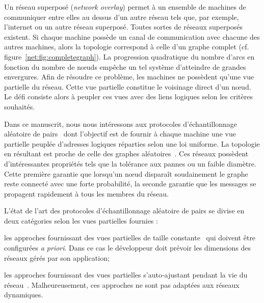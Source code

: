 Un réseau superposé (\emph{network overlay}) permet à un ensemble de machines de
communiquer entre elles au dessus d'un autre réseau tels que, par exemple,
l'internet ou un autre réseau superposé.  Toutes sortes de réseaux superposés
existent. Si chaque machine possède un canal de communication avec chacune des
autres machines, alors la topologie correspond à celle d'un graphe complet
(cf. figure~\ref{net:fig:completegraph}). La progression quadratique du nombre
d'arcs en fonction du nombre de nœuds empêche un tel système d'atteindre de
grandes envergures. Afin de résoudre ce problème, les machines ne possèdent
qu'une vue partielle du réseau. Cette vue partielle constitue le voisinage
direct d'un nœud. Le défi consiste alors à peupler ces vues avec des liens
logiques selon les critères souhaités.

Dans ce manuscrit, nous nous intéressons aux protocoles d'échantillonnage
aléatoire de pairs~\cite{jelasity2007gossip} dont l'objectif est de fournir à
chaque machine une vue partielle peuplée d'adresses logiques réparties selon une
loi uniforme. La topologie en résultant est proche de celle des graphes
aléatoires~\cite{erdos1959random}. Ces réseaux possèdent d'intéressantes
propriétés tels que la tolérance aux pannes ou un faible diamètre. Cette
première garantie que lorsqu'un nœud disparaît soudainement le graphe reste
connecté avec une forte probabilité, la seconde garantie que les messages se
propagent rapidement à tous les membres du réseau.


L'état de l'art des protocoles d'échantillonnage aléatoire de pairs se divise en
deux catégories selon les vues partielles fournies :
\begin{inparaenum}[(i)]
\item les approches fournissant des vues partielles de taille
  constante~\cite{eugster2003lightweight, leitao2007dependable,
    tolgyeski2009adaptive, voulgaris2005cyclon} qui doivent être configurées
  \emph{a priori}. Dans ce cas le développeur doit prévoir les dimensions des
  réseaux gérés par son application;
\item les approches fournissant des vues partielles s'auto-ajustant pendant la
  vie du réseau~\cite{ganesh2001scamp, ganesh2003peer}. Malheureusement, ces
  approches ne sont pas adaptées aux réseaux dynamiques.
\end{inparaenum}

